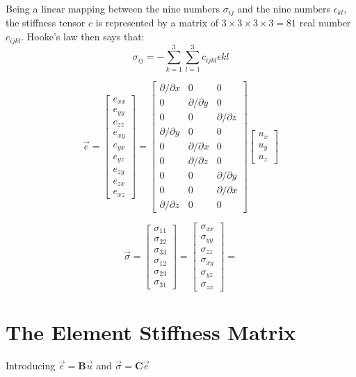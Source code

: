 \documentclass[10pt,a4paper]{article}
\begin{document}
Being a linear mapping between the nine numbers $ \sigma_{ij} $ and the nine numbers $ \epsilon_{kl} $, the stiffness tensor $ c $ is represented by a matrix of $ 3 \times 3 \times 3 \times 3 = 81 $ real number $ c_{ijkl} $. Hooke's law then says that:
\begin{equation}
\sigma_{ij} = - \sum_{k=1}^{3} \sum_{l=1}^{3} c_{ijkl} \epsilon{kl}
\end{equation}


\begin{equation}
\vec{e} = \begin{bmatrix}
e_{xx} \\ 
e_{yy} \\ 
e_{zz} \\ 
e_{xy} \\ 
e_{yx} \\ 
e_{yz} \\ 
e_{zy} \\ 
e_{zx} \\ 
e_{xz}
\end{bmatrix} = \begin{bmatrix}
\partial / \partial x & 0 & 0 \\ 
0 & \partial / \partial y & 0 \\ 
0 & 0 & \partial / \partial z \\ 
\partial / \partial y & 0 & 0 \\ 
0 & \partial / \partial x & 0 \\ 
0 & \partial / \partial z & 0 \\ 
0 & 0 & \partial / \partial y \\ 
0 & 0 & \partial / \partial x \\ 
\partial / \partial z & 0 & 0
\end{bmatrix} \begin{bmatrix}
u_x \\ 
u_y \\ 
u_z
\end{bmatrix} 
\end{equation}

\begin{equation}
\vec{\sigma} = \begin{bmatrix}
\sigma_{11} \\ 
\sigma_{22} \\ 
\sigma_{33} \\ 
\sigma_{12} \\ 
\sigma_{23} \\ 
\sigma_{31}
\end{bmatrix} = \begin{bmatrix}
\sigma_{xx} \\ 
\sigma_{yy} \\ 
\sigma_{zz} \\ 
\sigma_{xy} \\ 
\sigma_{yz} \\ 
\sigma_{zx}
\end{bmatrix} = 
\end{equation}

\section{The Element Stiffness Matrix}
Introducing $ \vec{e} = \mathbf{B} \vec{u} $ and $ \vec{\sigma} = \mathbf{C} \vec{e} $
\end{document}
